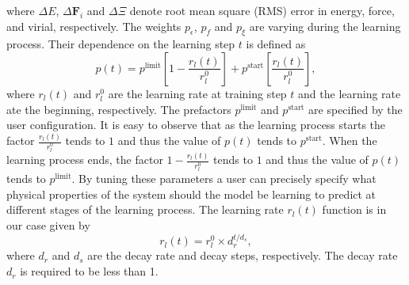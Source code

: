 where $\Delta E$, $\Delta \mathbf{F}_i$ and $\Delta \Xi$ denote root mean
square (RMS) error in energy, force, and virial, respectively. The weights
$p_\epsilon$, $p_f$ and $p_\xi$ are varying during the learning process. Their
dependence on the learning step $t$ is defined as
\begin{equation}
  p(t) = p^\text{limit} \left[1 - \frac{r_l(t)}{r_l^0}\right]
  + p^\text{start} \left[\frac{r_l(t)}{r_l^0}\right],
\end{equation}
where $r_l(t)$ and $r_l^0$ are the learning rate at training step $t$ and the
learning rate ate the beginning, respectively. The prefactors $p^\text{limit}$
and $p^\text{start}$ are specified by the user configuration. It is easy to
observe that as the learning process starts the factor $\frac{r_l(t)}{r_l^0}$
tends to $1$ and thus the value of $p(t)$ tends to $p^\text{start}$. When the
learning process ends, the factor $1 - \frac{r_l(t)}{r_l^0}$ tends to $1$ and
thus the value of $p(t)$ tends to $p^\text{limit}$. By tuning these
parameters a user can precisely specify what physical properties of the system
should the model be learning to predict at different stages of the learning
process. The learning rate $r_l(t)$ function is in our case given by
\begin{equation}
  r_l(t) = r_l^0 \times d_r^{t/d_s},
\end{equation}
where $d_r$ and $d_s$ are the decay rate and decay steps, respectively. The
decay rate $d_r$ is required to be less than 1.
